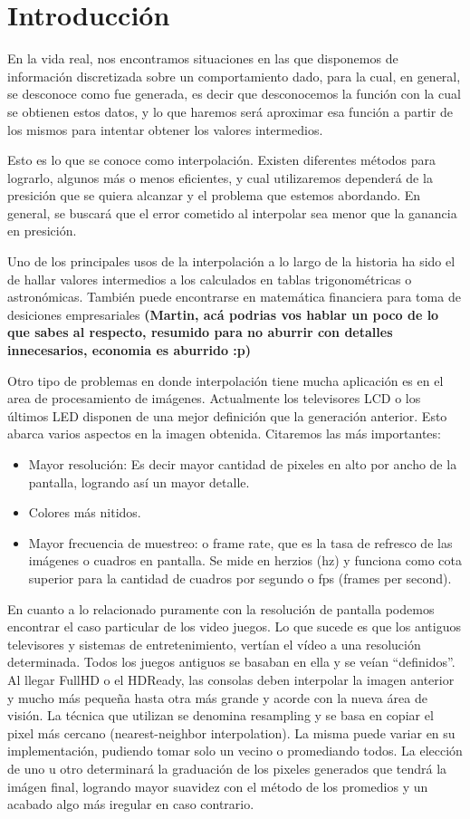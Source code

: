 \section{Introducción}
En la vida real, nos encontramos situaciones en las que disponemos de información discretizada sobre un comportamiento dado, para la cual, en general, se desconoce como fue generada, es decir que desconocemos la función con la cual se obtienen estos datos, y lo que haremos será aproximar esa función a partir de los mismos para intentar obtener los valores intermedios. 

Esto es lo que se conoce como interpolación. Existen diferentes métodos para lograrlo, algunos más o menos eficientes, y cual utilizaremos dependerá de la presición que se quiera alcanzar y el problema que estemos abordando. En general, se buscará que el error cometido al interpolar sea menor que la ganancia en presición.

Uno de los principales usos de la interpolación a lo largo de la historia ha sido el de hallar valores intermedios a los calculados en tablas trigonométricas
o astronómicas. También puede encontrarse en matemática financiera para toma de desiciones empresariales \textbf{(Martin, acá podrias vos hablar un poco de lo que sabes al respecto, resumido para no aburrir con detalles innecesarios, economia es aburrido :p)} 

Otro tipo de problemas en donde interpolación tiene mucha aplicación es en el area de procesamiento de imágenes. 
Actualmente los televisores LCD o los últimos LED disponen de una mejor definición que la generación anterior. 
Esto abarca varios aspectos en la imagen obtenida. Citaremos las más importantes:
\begin{itemize}
	\item Mayor resolución: Es decir mayor cantidad de pixeles en alto por ancho de la pantalla, logrando así un mayor detalle.
	\item Colores más nitidos.
	\item Mayor frecuencia de muestreo: o frame rate, que es la tasa de refresco de las imágenes o cuadros en pantalla. Se mide en herzios (hz) y funciona como cota superior para la cantidad de cuadros por segundo o fps (frames per second).
\end{itemize}	

En cuanto a lo relacionado puramente con la resolución de pantalla podemos encontrar el caso particular de los video juegos. 
Lo que sucede es que los antiguos televisores y sistemas de entretenimiento, vertían el vídeo a una resolución determinada. Todos los juegos antiguos se basaban en ella y se veían “definidos”. Al llegar FullHD o el HDReady, las consolas deben interpolar la imagen anterior y mucho más pequeña hasta otra más grande y acorde con la nueva área de visión. La técnica que utilizan se denomina resampling y se basa en copiar el pixel más cercano (nearest-neighbor interpolation). La misma puede variar en su implementación, pudiendo tomar solo un vecino o promediando todos. La elección de uno u otro determinará la graduación de los pixeles generados que tendrá la imágen final, logrando mayor suavidez con el método de los promedios y un acabado algo más iregular en caso contrario.

